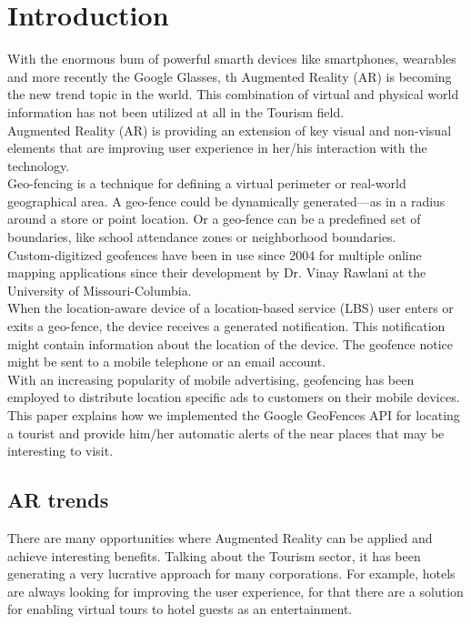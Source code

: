 \section{Introduction}
With the enormous bum of powerful smarth devices like smartphones, wearables and more
recently the Google Glasses, th Augmented Reality (AR) is becoming the new trend topic
in the world. This combination of virtual and physical world information has not been
utilized at all in the Tourism field. \\

Augmented Reality (AR) is providing an extension of key visual and non-visual elements
that are improving user experience in her/his interaction with the technology. \\

Geo-fencing is a technique for defining a virtual perimeter or real-world geographical 
area. A geo-fence could be dynamically generated—as in a radius around a store or point location. Or a geo-fence can be a predefined set of boundaries, like school attendance zones or neighborhood boundaries. \\

Custom-digitized geofences have been in use since 2004 for multiple online mapping applications since their development by Dr. Vinay Rawlani at the University of Missouri-Columbia. \\

When the location-aware device of a location-based service (LBS) user enters or exits a geo-fence, the device receives a generated notification. This notification might contain information about the location of the device. The geofence notice might be sent to a mobile telephone or an email account.\\

With an increasing popularity of mobile advertising, geofencing has been employed to distribute location specific ads to customers on their mobile devices. This paper explains how we implemented the Google GeoFences API for locating a tourist and provide him/her automatic alerts of the near places that may be interesting to visit.



\subsection{AR trends}
There are many opportunities where Augmented Reality can be applied and achieve 
interesting benefits. Talking about the Tourism sector, it has been generating a very
lucrative approach for many corporations. For example, hotels are always looking for 
improving the user experience, for that there are a solution for enabling virtual
tours to hotel guests as an entertainment. \\

